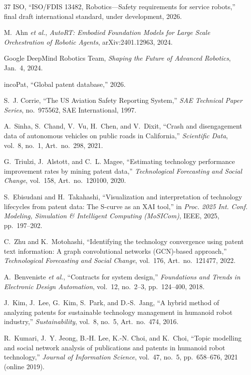 \documentclass[letterpaper,9pt,conference]{ieeeconf}
\begin{document}
\begin{thebibliography}{37}
ISO, ``ISO/FDIS 13482, Robotics---Safety requirements for service robots,'' final draft international standard, under development, 2026.

M.~Ahn \emph{et al.}, \textit{AutoRT: Embodied Foundation Models for Large Scale Orchestration of Robotic Agents}, arXiv:2401.12963, 2024.

Google DeepMind Robotics Team, \textit{Shaping the Future of Advanced Robotics}, Jan.~4, 2024.

incoPat, ``Global patent database,'' 2026.

S.~J. Corrie, ``The US Aviation Safety Reporting System,'' \textit{SAE Technical Paper Series}, no.~975562, SAE International, 1997.

A.~Sinha, S.~Chand, V.~Vu, H.~Chen, and V.~Dixit, ``Crash and disengagement data of autonomous vehicles on public roads in California,'' \textit{Scientific Data}, vol.~8, no.~1, Art.~no.~298, 2021.

G.~Triulzi, J.~Alstott, and C.~L. Magee, ``Estimating technology performance improvement rates by mining patent data,'' \textit{Technological Forecasting and Social Change}, vol.~158, Art.~no.~120100, 2020.

S.~Ebisudani and H.~Takahashi, ``Visualization and interpretation of technology lifecycles from patent data: The S-curve as an XAI tool,'' in \textit{Proc. 2025 Int. Conf. Modeling, Simulation \& Intelligent Computing (MoSICom)}, IEEE, 2025, pp.~197--202.

C.~Zhu and K.~Motohashi, ``Identifying the technology convergence using patent text information: A graph convolutional networks (GCN)-based approach,'' \textit{Technological Forecasting and Social Change}, vol.~176, Art.~no.~121477, 2022.

A.~Benveniste \emph{et al.}, ``Contracts for system design,'' \textit{Foundations and Trends in Electronic Design Automation}, vol.~12, no.~2--3, pp.~124--400, 2018.

J.~Kim, J.~Lee, G.~Kim, S.~Park, and D.-S.~Jang, ``A hybrid method of analyzing patents for sustainable technology management in humanoid robot industry,'' \textit{Sustainability}, vol.~8, no.~5, Art.~no.~474, 2016.

R.~Kumari, J.~Y. Jeong, B.-H. Lee, K.-N. Choi, and K.~Choi, ``Topic modelling and social network analysis of publications and patents in humanoid robot technology,'' \textit{Journal of Information Science}, vol.~47, no.~5, pp.~658--676, 2021 (online 2019).


\end{thebibliography}
\end{document}
